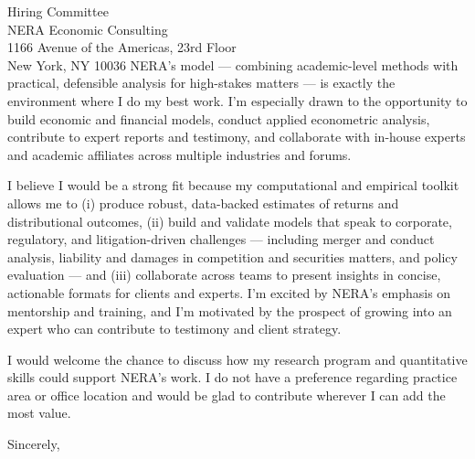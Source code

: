 \documentclass[11pt,letterpaper]{letter}
\begin{document}
\begin{letter}{Hiring Committee \\
NERA Economic Consulting \\
1166 Avenue of the Americas, 23rd Floor \\
New York, NY 10036}
NERA’s model — combining academic-level methods with practical, defensible analysis for high-stakes matters — is exactly the environment where I do my best work. I’m especially drawn to the opportunity to build economic and financial models, conduct applied econometric analysis, contribute to expert reports and testimony, and collaborate with in-house experts and academic affiliates across multiple industries and forums.

I believe I would be a strong fit because my computational and empirical toolkit allows me to (i) produce robust, data-backed estimates of returns and distributional outcomes, (ii) build and validate models that speak to corporate, regulatory, and litigation-driven challenges — including merger and conduct analysis, liability and damages in competition and securities matters, and policy evaluation — and (iii) collaborate across teams to present insights in concise, actionable formats for clients and experts. I’m excited by NERA’s emphasis on mentorship and training, and I’m motivated by the prospect of growing into an expert who can contribute to testimony and client strategy.

I would welcome the chance to discuss how my research program and quantitative skills could support NERA’s work. I do not have a preference regarding practice area or office location and would be glad to contribute wherever I can add the most value.

\closing{Sincerely,}

\end{letter}
\end{document}
